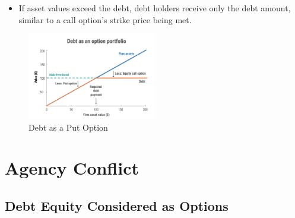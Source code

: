 \begin{itemize}
\begin{itemize}
        \item If asset values exceed the debt, debt holders receive only the debt amount, similar to a call option's strike price being met.
      \end{itemize}
      \begin{figure}[H]
        \centering
        \includegraphics[width=0.5\textwidth]{img/10.2.2.png}
        \caption{Debt as a Put Option}
        \end{figure}
  \end{itemize}
  
\section{Agency Conflict}
\subsection*{Debt Equity Considered as Options}

